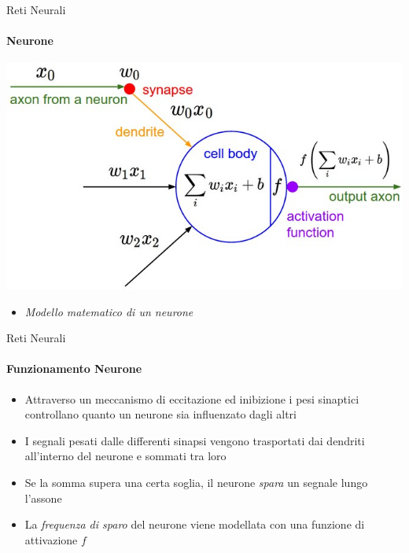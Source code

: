 \documentclass[
 ]{beamer}
\begin{document}
\begin{frame}{Reti Neurali}
    \framesubtitle{Neurone}
    
    \begin{center}
      \includegraphics[scale = 0.4]{neuron_model.jpeg}
    \end{center}
  
    \bigskip 
  
  \begin{itemize}
    \setlength\itemsep{1em}
    \item[] \large \emph{Modello matematico di un neurone}
  \end{itemize}       
\end{frame} 


\begin{frame}{Reti Neurali}
    \framesubtitle{Funzionamento Neurone}
    \begin{itemize} [<+->]
        \setlength\itemsep{2em}
        \item \large Attraverso un meccanismo di eccitazione ed inibizione i pesi sinaptici controllano quanto un neurone sia influenzato dagli altri
       \item \large I segnali pesati dalle differenti sinapsi vengono trasportati dai dendriti all'interno del neurone e sommati tra loro
       \item \large Se la somma supera una certa soglia, il neurone \emph{spara} un segnale lungo l'assone 
       \item \large La \emph{frequenza di sparo} del neurone viene modellata con una funzione di attivazione $f$       
    \end{itemize}
\end{frame}

\end{document}
